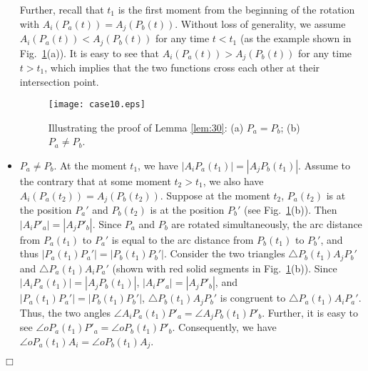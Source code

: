 \documentclass[11pt]{article}
\newenvironment{proof}{\noindent {\textbf{Proof:}}\rm}{\hfill $\Box$
\rm}
\begin{document}
\begin{proof}
\begin{itemize}
Further, recall that $t_1$ is the first moment from the beginning of
the rotation with $A_i(P_a(t))=A_j(P_b(t))$. Without loss of
generality, we assume $A_i(P_a(t))<A_j(P_b(t))$ for any time $t<t_1$ (as
the example shown in Fig.~\ref{fig:case10}(a)). It is easy to see
that $A_i(P_a(t))>A_j(P_b(t))$ for any time $t>t_1$, which implies that
the two functions cross each other at their intersection point.

\begin{figure}[t]
\begin{minipage}[t]{\linewidth}
\begin{center}
\texttt{[image: case10.eps]}
\caption{\footnotesize Illustrating the proof
of Lemma \ref{lem:30}: (a) $P_a=P_b$; (b) $P_a\neq P_b$.} \label{fig:case10}
\end{center}
\end{minipage}
\vspace*{-0.10in}
\end{figure}

\item
$P_a\neq P_b$. At the moment $t_1$, we have $|A_iP_a(t_1)|=|A_jP_b(t_1)|$.
Assume to the contrary that at some moment $t_2>t_1$, we also have
$A_i(P_a(t_2))=A_j(P_b(t_2))$. Suppose at the moment $t_2$, $P_a(t_2)$ is at
the position $P_a'$ and $P_b(t_2)$ is at the position $P_b'$ (see
Fig.~\ref{fig:case10}(b)). Then $|A_iP'_a|=|A_jP'_b|$. Since $P_a$
and $P_b$ are rotated simultaneously, the arc distance from $P_a(t_1)$ to
$P_a'$ is equal to the arc distance from $P_b(t_1)$ to $P_b'$, and thus
$|P_a(t_1)P_a'|=|P_b(t_1)P_b'|$. Consider the two triangles $\triangle P_b(t_1)A_jP_b'$
and $\triangle P_a(t_1)A_iP_a'$ (shown with red solid segments
in Fig.~\ref{fig:case10}(b)).
Since $|A_iP_a(t_1)|=|A_jP_b(t_1)|$, $|A_iP'_a|=|A_jP'_b|$, and
$|P_a(t_1)P_a'|=|P_b(t_1)P_b'|$, $\triangle P_b(t_1)A_jP_b'$ is congruent to
$\triangle P_a(t_1)A_iP_a'$. Thus, the two angles $\angle
A_iP_a(t_1)P'_a=\angle A_jP_b(t_1)P'_b$. Further, it is easy to see
$\angle oP_a(t_1)P'_a=\angle oP_b(t_1)P'_b$. Consequently, we have $\angle
oP_a(t_1)A_i=\angle oP_b(t_1)A_j$.


\end{itemize}
\end{proof}
\end{document}
